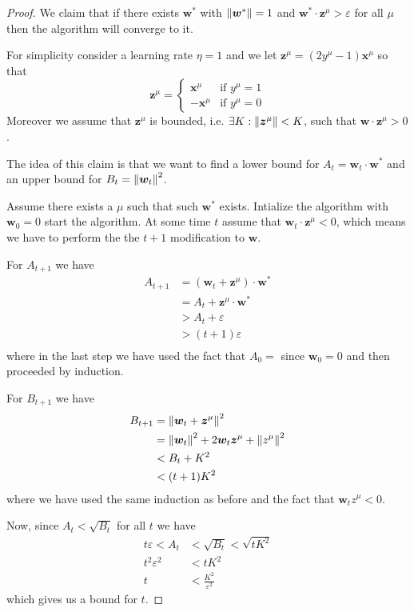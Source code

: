 \documentclass[12pt]{extarticle}
\renewcommand{\vec}[1]{\bm{#1}}
\begin{document}
\begin{proof}
	We claim that if there exists $\vec w^*$ with $\norm{\vec w^*} = 1$ and
	$\vec w^* \cdot \vec z^\mu > \varepsilon$ for all $\mu$ then the algorithm will converge to it.

	For simplicity consider a learning rate $\eta = 1$
	and we let $\vec z^\mu = (2 y^\mu - 1) \vec x^\mu$ so that
	\begin{equation}
		\vec z^\mu = \begin{cases}
			\vec x^\mu  & \text{if }y^\mu = 1 \\
			-\vec x^\mu & \text{if }y^\mu = 0
		\end{cases}
	\end{equation}
	Moreover we assume that $\vec z^\mu$ is bounded, i.e. $\exists K : \norm{\vec z^\mu} < K$,
	such that $\vec w \cdot \vec z^\mu > 0$.

	The idea of this claim is that we want to find a lower bound for $A_t = \vec w_t \cdot \vec w^*$
	and an upper bound for $B_t = \norm{\vec w_t}^2$.

	Assume there exists a $\mu$ such that such $\vec w^*$ exists.
	Intialize the algorithm with $\vec w_0 = 0$ start the algorithm.
	At some time $t$ assume that $\vec w_t \cdot \vec z^\mu <0$, which means we have to perform the
	the $t+1$ modification to $\vec w$.

	For $A_{t+1}$ we have
	\begin{align}
		A_{t+1} & = (\vec w_t + \vec z^\mu) \cdot \vec w^* \\
		        & = A_t + \vec z^\mu \cdot \vec w^*        \\
		        & > A_t + \varepsilon                      \\
		        & > (t+1) \varepsilon                      \\
	\end{align}
	where in the last step we have used the fact that $A_0 = $ since $\vec w_0 = 0$ and then proceeded
	by induction.

	For $B_{t+1}$ we have
	\begin{align}
		B_{t+1} & = \norm{\vec w_t + \vec z^\mu}^2                             \\
		        & = \norm{\vec w_t}^2 + 2 \vec w_t \vec z^\mu + \norm{z^\mu}^2 \\
		        & < B_t + K^2                                                  \\
		        & < (t+1)K^2
	\end{align}
	where we have used the same induction as before and the fact that $\vec w_t z^\mu < 0$.

	Now, since $A_t < \sqrt{B_t}$ for all $t$ we have
	\begin{align}
		t\varepsilon < A_t & < \sqrt{B_t} < \sqrt{t K^2} \\
		t^2 \varepsilon^2  & < t K^2                     \\
		t                  & < \frac{K^2}{\varepsilon^2}
	\end{align}
	which gives us a bound for $t$.
\end{proof}
\end{document}
